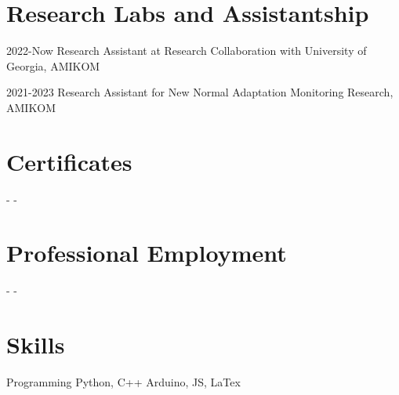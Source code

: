\documentclass[12pt,letterpaper]{report}
\begin{document}
    \section*{Research Labs and Assistantship}
    \begin{tablist}
        \item[2022-Now] \tab{}Research Assistant at Research Collaboration with University of Georgia, AMIKOM
        \item[2021-2023] \tab{}Research Assistant for New Normal Adaptation Monitoring Research, AMIKOM
    \end{tablist}

    \section*{Certificates}
    \begin{tablist}
        \item[-] \tab{}-
    \end{tablist}

    \section*{Professional Employment}
    \begin{tablist}
        \item[-] \tab{}-
    \end{tablist}

    \section*{Skills}
    \begin{tablist}
        \item[Programming] \tab{}Python, C++ Arduino, JS, LaTex
    \end{tablist}
\end{document}
